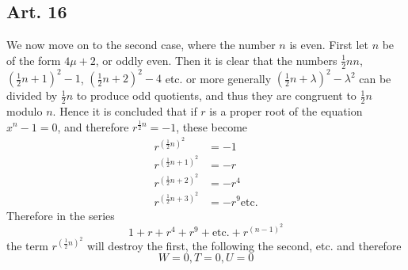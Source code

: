 \documentclass{book}
\theoremstyle{plain}
\theoremstyle{remark}
\begin{document}
\subsection*{Art. 16} 
We now move on to the second case, where the number $n$ is even.  First let $n$ be of the form $4\mu + 2$, or oddly even.  Then it is clear that the numbers $\tfrac{1}{2}nn$, $(\tfrac{1}{2}n+1)^2-1$, $(\tfrac{1}{2}n+2)^2 - 4$ etc. or more generally $(\tfrac{1}{2}n+\lambda)^2 - \lambda^2$ can be divided by $\frac{1}{2} n$ to produce odd quotients, and thus they are congruent to $\tfrac{1}{2}n$ modulo $n$.  Hence it is concluded that if $r$ is a proper root of the equation $x^n-1=0$, and therefore $r^{\frac{1}{2}n} = -1$, these become
\begin{align*}
r^{(\frac{1}{2}n)^2} &= -1 \\
r^{(\frac{1}{2}n+1)^2} &= -r \\ 
r^{(\frac{1}{2}n+2)^2} &= -r^4 \\ 
r^{(\frac{1}{2}n+3)^2} &= -r^9 \textrm{etc.}
\end{align*}
Therefore in the series 
\[ 1+ r+ r^4 + r^9 + \textrm{etc.} + r^{(n-1)^2} \]
the term $r^{(\frac{1}{2}n)^2}$ will destroy the first, the following the second, etc. and therefore
\[ W = 0, T = 0, U = 0 \]
\end{document}
